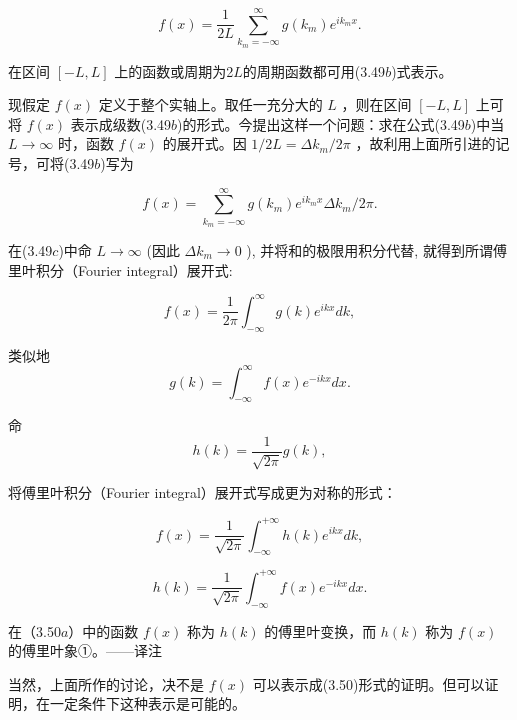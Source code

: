 \begin{equation*}
f (x) = \frac {1}{2 L} \sum_ {k _ {m} = - \infty} ^ {\infty} g (k _ {m}) e ^ {i k _ {m} x}.\tag{3.49b}
\end{equation*}

在区间 $[-L, L]$ 上的函数或周期为2$L$的周期函数都可用(3.49$b$)式表示。

现假定 $f(x)$ 定义于整个实轴上。取任一充分大的 $L$ ，则在区间 $[-L, L]$ 上可将 $f(x)$ 表示成级数(3.49$b$)的形式。今提出这样一个问题：求在公式(3.49$b$)中当 $L \to \infty$ 时，函数 $f(x)$ 的展开式。因 $1/2L = \Delta k_m / 2\pi$ ，故利用上面所引进的记号，可将(3.49$b$)写为

\begin{equation*}
f (x) = \sum_ {k _ {m} = - \infty} ^ {\infty} g (k _ {m}) e ^ {i k _ {m} x} \Delta k _ {m} / 2 \pi .\tag{3.49c}
\end{equation*}

在(3.49$c$)中命 $L \to \infty$ (因此 $\Delta k_{m} \to 0$ ), 并将和的极限用积分代替, 就得到所谓傅里叶积分（Fourier integral）展开式:

\begin{equation*}
f (x) = \frac {1}{2 \pi} \int_ {- \infty} ^ {\infty} g (k) e ^ {i k x} d k,
\end{equation*}

类似地
\begin{equation*}
g (k) = \int_ {- \infty} ^ {\infty} f (x) e ^ {- i k x} d x.
\end{equation*}

命
\begin{equation*}
h (k) = \frac {1}{\sqrt {2 \pi}} g (k),
\end{equation*}

将傅里叶积分（Fourier integral）展开式写成更为对称的形式：

\begin{equation*}
f (x) = \frac {1}{\sqrt {2 \pi}} \int_ {- \infty} ^ {+ \infty} h (k) e ^ {i k x} d k,\tag{3.50a}
\end{equation*}

\begin{equation*}
h (k) = \frac {1}{\sqrt {2 \pi}} \int_ {- \infty} ^ {+ \infty} f (x) e ^ {- i k x} d x.\tag{3.50b}
\end{equation*}

在（3.50$a$）中的函数 $f(x)$ 称为 $h(k)$ 的傅里叶变换，而 $h(k)$ 称为 $f(x)$ 的傅里叶象①。——译注

当然，上面所作的讨论，决不是 $f(x)$ 可以表示成(3.50)形式的证明。但可以证明，在一定条件下这种表示是可能的。

